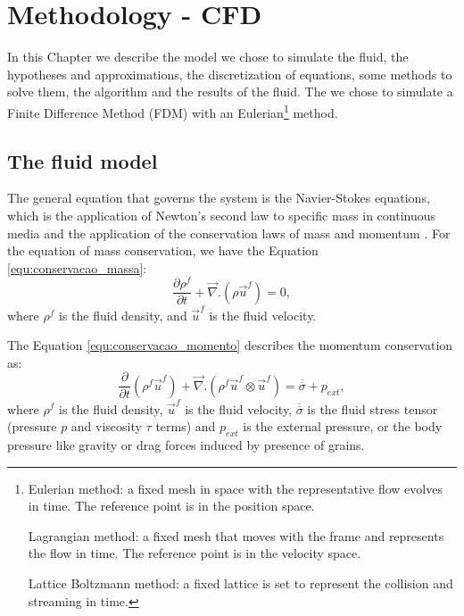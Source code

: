 \chapter{Methodology - CFD}
\label{chap:CFD}

    In this Chapter we describe the model we chose to simulate the fluid, the hypotheses and approximations, the discretization of equations, some methods to solve them, the algorithm and the results of the fluid. The we chose to simulate a Finite Difference Method (FDM) with an Eulerian\footnote{
    Eulerian method: a fixed mesh in space with the representative flow evolves in time. The reference point is in the position space.

    Lagrangian method: a fixed mesh that moves with the frame and represents the flow in time. The reference point is in the velocity space.

    Lattice Boltzmann method: a fixed lattice is set to represent the collision and streaming in time.
} method.

\section{The fluid model}
    The general equation that governs the system is the Navier-Stokes equations, which is the application of Newton's second law to specific mass in continuous media and the application of the conservation laws of mass and momentum \cite{Physical_Hydrodynamics, Fluid_Mechanics}. For the equation of mass conservation, we have the Equation \ref{equ:conservacao_massa}: 
\begin{equation}
    \frac{\partial \rho^{f}}{\partial t} +\vec{\nabla}.(\rho \vec{u}^{f}) = 0,
    \label{equ:conservacao_massa}
\end{equation}
where $\rho^{f}$ is the fluid density, and $\vec{u}^{f}$ is the fluid velocity.

    The Equation \ref{equ:conservacao_momento} describes the momentum conservation as:
\begin{equation}
    \frac{\partial}{\partial t}\left(\rho^{f}\vec{u}^{f}\right) +\vec{\nabla}.\left(\rho^{f}\vec{u}^{f}\otimes\vec{u}^{f}\right) = \overline{\overline{\sigma}} +p_{ext},
    \label{equ:conservacao_momento}
\end{equation}
where $\rho^{f}$ is the fluid density, $\vec{u}^{f}$ is the fluid velocity, $\overline{\overline{\sigma}}$ is the fluid stress tensor (pressure $p$ and viscosity $\tau$ terms) and $p_{ext}$ is the external pressure, or the body pressure like gravity or drag forces induced by presence of grains.

